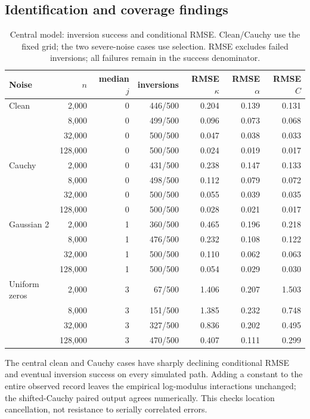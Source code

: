 \documentclass[11pt,a4paper]{article}
\theoremstyle{remark}\newtheorem{remark}[theorem]{Remark}
\begin{document}
\subsection{Identification and coverage findings}
\begin{table}[htbp]\centering\small
\caption{Central model: inversion success and conditional RMSE. Clean/Cauchy use the fixed grid; the two severe-noise cases use selection. RMSE excludes failed inversions; all failures remain in the success denominator.}\label{tab:estimate}
\begin{tabular}{lrrrrrr}\toprule
Noise & $n$ & median $j$ & inversions & RMSE $\kappa$ & RMSE $\alpha$ & RMSE $C$\\ \midrule
Clean & 2,000 & 0 & 446/500 & 0.204 & 0.139 & 0.131 \\
 & 8,000 & 0 & 499/500 & 0.096 & 0.073 & 0.068 \\
 & 32,000 & 0 & 500/500 & 0.047 & 0.038 & 0.033 \\
 & 128,000 & 0 & 500/500 & 0.024 & 0.019 & 0.017 \\
\addlinespace[0.6ex]
Cauchy & 2,000 & 0 & 431/500 & 0.238 & 0.147 & 0.133 \\
 & 8,000 & 0 & 498/500 & 0.112 & 0.079 & 0.072 \\
 & 32,000 & 0 & 500/500 & 0.055 & 0.039 & 0.035 \\
 & 128,000 & 0 & 500/500 & 0.028 & 0.021 & 0.017 \\
\addlinespace[0.6ex]
Gaussian 2 & 2,000 & 1 & 360/500 & 0.465 & 0.196 & 0.218 \\
 & 8,000 & 1 & 476/500 & 0.232 & 0.108 & 0.122 \\
 & 32,000 & 1 & 500/500 & 0.110 & 0.062 & 0.063 \\
 & 128,000 & 1 & 500/500 & 0.054 & 0.029 & 0.030 \\
\addlinespace[0.6ex]
Uniform zeros & 2,000 & 3 & 67/500 & 1.406 & 0.207 & 1.503 \\
 & 8,000 & 3 & 151/500 & 1.385 & 0.232 & 0.748 \\
 & 32,000 & 3 & 327/500 & 0.836 & 0.202 & 0.495 \\
 & 128,000 & 3 & 470/500 & 0.407 & 0.111 & 0.299 \\
\bottomrule\end{tabular}
\end{table}

The central clean and Cauchy cases have sharply declining conditional RMSE and eventual inversion success on every simulated path. Adding a constant to the entire observed record leaves the empirical log-modulus interactions unchanged; the shifted-Cauchy paired output agrees numerically. This checks location cancellation, not resistance to serially correlated errors.
\end{document}

